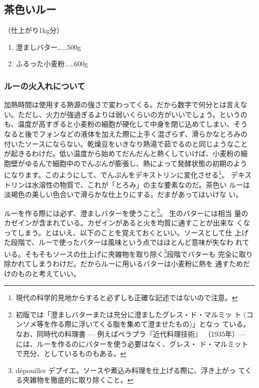 \documentclass[twoside,12Q,b5paper]{escoffierltjsbook}
\def\tightlist{\itemsep1pt\parskip0pt\parsep0pt}
\newenvironment{recette}{\begin{multicols}{2}}{\end{multicols}}
\begin{document}
\begin{recette}

\subsection{茶色いルー}\label{ux8336ux8272ux3044ux30ebux30fc}

（仕上がり1kg分）

\begin{enumerate}
\def\labelenumi{\arabic{enumi}.}
\tightlist
\item
  澄ましバター\ldots{}\ldots{}500g
\item
  ふるった小麦粉\ldots{}\ldots{}600g
\end{enumerate}

\subsubsection{ルーの火入れについて}\label{ux30ebux30fcux306eux706bux5165ux308cux306bux3064ux3044ux3066}

加熱時間は使用する熱源の強さで変わってくる。だから数字で何分とは言えな
い。ただし、火力が強過ぎるよりは弱いくらいの方がいいでしょう。というの
も、温度が高すぎると小麦粉の細胞が硬化して中身を閉じ込めてしまい、そう
なると後でフォンなどの液体を加えた際に上手く混ざらず、滑らかなとろみの
付いたソースにならない。乾燥豆をいきなり熱湯で茹でるのと同じようなこと
が起きるわけだ。低い温度から始めてだんだんと熱くしていけば、小麦粉の細
胞壁がゆるんで細胞中のでんぷんが膨張し、熱によって発酵状態の初期のよう
になります。このようにして、でんぷんをデキストリンに変化させる\footnote{現代の科学的見地からすると必ずしも正確な記述ではないので注意。}。
デキストリンは水溶性の物質で、これが「とろみ」の主な要素なのだ。茶色い
ルーは淡褐色の美しい色合いで滑らかな仕上りにする。だまがあってはいけな
い。

ルーを作る際には必ず、澄ましバターを使うこと\footnote{初版では「澄ましバターまたは充分に澄ましたグレス・ド・マルミッ
  ト (コンソメ等を作る際に浮いてくる脂を集めて澄ませたもの)」となっ
  ている。なお、同時代の料理書 --- 例えばペラプラ『近代料理技術』
  （1935年）--- には、ルーを作るのにバターを使う必要はなく、グレス・
  ド・マルミットで充分、としているものもある。}。 生のバターには相当
量のカゼインが含まれている。カゼインがあると火を均質に通すことが出来な
くなってしまう。とはいえ、以下のことを覚えておくといい。ソースとして仕
上げた段階で、ルーで使ったバターは風味という点ではほとんど意味が失なわ
れている。そもそもソースの仕上げに夾雑物を取り除く\footnote{dépouiller
  デプイエ。ソースや煮込み料理を仕上げる際に、浮き上がっ
  てくる夾雑物を徹底的に取り除くこと。}段階でバターも
完全に取り除かれてしまうわけだ。だからルーに用いるバターは小麦粉に熱を
通すためだけのものと考えていい。


\end{recette}
\end{document}
